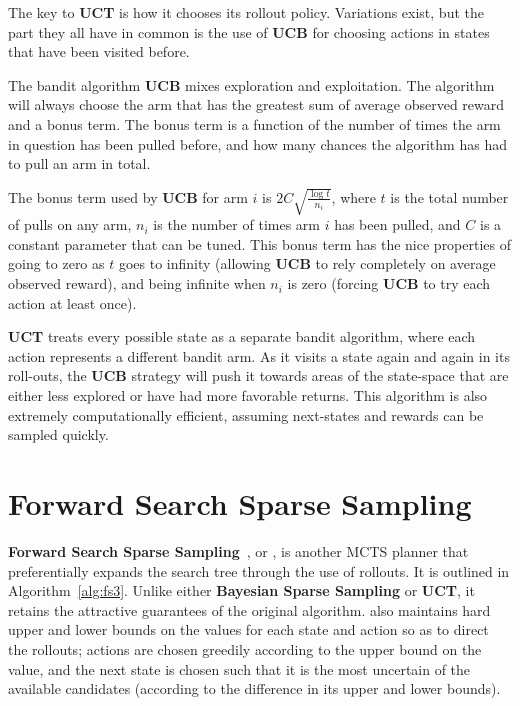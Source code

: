 The key to {\bf UCT} is how it chooses its rollout policy. Variations exist, but the part they all have in common is the use of {\bf UCB} for choosing actions in states that have been visited before.

The bandit algorithm {\bf UCB} mixes exploration and exploitation. The algorithm will always choose the arm that has the greatest sum of average observed reward and a bonus term. The bonus term is a function of the number of times the arm in question has been pulled before, and how many chances the algorithm has had to pull an arm in total.

The bonus term used by {\bf UCB} for arm $i$ is $2 C \sqrt{\frac{\log t}{n_i}}$, where $t$ is the total number of pulls on any arm, $n_i$ is the number of times arm $i$ has been pulled, and $C$ is a constant parameter that can be tuned. This bonus term has the nice properties of going to zero as $t$ goes to infinity (allowing {\bf UCB} to rely completely on average observed reward), and being infinite when $n_i$ is zero (forcing {\bf UCB} to try each action at least once).


{\bf UCT} treats every possible state as a separate bandit algorithm, where each action represents a different bandit arm. As it visits a state again and again in its roll-outs, the {\bf UCB} strategy will push it towards areas of the state-space that are either less explored or have had more favorable returns. This algorithm is also extremely computationally efficient, assuming next-states and rewards can be sampled quickly.

\section{Forward Search Sparse Sampling}

\label{sec:rel:fsss}

{\bf Forward Search Sparse Sampling}~\cite{walsh10}, or , is another MCTS planner that preferentially expands the search tree through the use of rollouts. It is outlined in Algorithm~\ref{alg:fs3}. Unlike either {\bf Bayesian Sparse Sampling} or {\bf UCT}, it retains the attractive guarantees of the original  algorithm.  also maintains hard upper and lower bounds on the values for each state and action so as to direct the rollouts; actions are chosen greedily according to the upper bound on the value, and the next state is chosen such that it is the most uncertain of the available candidates (according to the difference in its upper and lower bounds).

